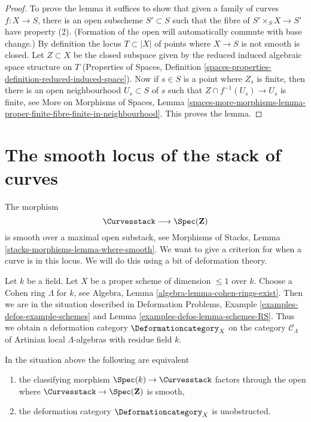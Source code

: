 \begin{proof}
To prove the lemma it suffices to show that given a family of curves
$f : X \to S$, there is an open subscheme $S' \subset S$
such that the fibre of $S' \times_S X \to S'$ have property (2).
(Formation of the open will automatically commute with base change.)
By definition the locus $T \subset |X|$ of points where $X \to S$
is not smooth is closed. Let $Z \subset X$ be the closed subspace
given by the reduced induced algebraic space structure on $T$
(Properties of Spaces, Definition
\ref{spaces-properties-definition-reduced-induced-space}).
Now if $s \in S$ is a point where $Z_s$ is finite, then there
is an open neighbourhood $U_s \subset S$ of $s$ such that
$Z \cap f^{-1}(U_s) \to U_s$ is finite, see
More on Morphisms of Spaces, Lemma
\ref{spaces-more-morphisms-lemma-proper-finite-fibre-finite-in-neighbourhood}.
This proves the lemma.
\end{proof}




\section{The smooth locus of the stack of curves}
\label{section-smooth}

\noindent
The morphism
$$
\Curvesstack \longrightarrow \Spec(\mathbf{Z})
$$
is smooth over a maximal open substack, see
Morphisms of Stacks, Lemma \ref{stacks-morphisms-lemma-where-smooth}.
We want to give a criterion for when a curve is in this locus.
We will do this using a bit of deformation theory.

\medskip\noindent
Let $k$ be a field. Let $X$ be a proper scheme of dimension $\leq 1$ over $k$.
Choose a Cohen ring $\Lambda$ for $k$, see
Algebra, Lemma \ref{algebra-lemma-cohen-rings-exist}.
Then we are in the situation described in
Deformation Problems, Example \ref{examples-defos-example-schemes} and
Lemma \ref{examples-defos-lemma-schemes-RS}.
Thus we obtain a deformation category $\Deformationcategory_X$
on the category $\mathcal{C}_\Lambda$ of Artinian local
$\Lambda$-algebras with residue field $k$.

\begin{lemma}
\label{lemma-in-smooth-locus}
In the situation above the following are equivalent
\begin{enumerate}
\item the classifying morphism $\Spec(k) \to \Curvesstack$ factors
through the open where $\Curvesstack \to \Spec(\mathbf{Z})$ is smooth,
\item the deformation category $\Deformationcategory_X$ is unobstructed.
\end{enumerate}
\end{lemma}

